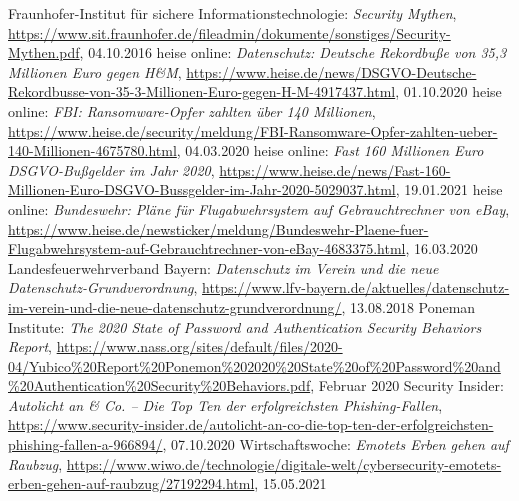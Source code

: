 \begin{frame}
{\begin{thebibliography}{LFVByXX}
     Fraunhofer-Institut für sichere Informationstechnologie: \textit{Security Mythen},  \href{https://www.sit.fraunhofer.de/fileadmin/dokumente/sonstiges/Security-Mythen.pdf}{\url{https://www.sit.fraunhofer.de/fileadmin/dokumente/sonstiges/Security-Mythen.pdf}}, 04.10.2016
     heise online: \textit{Datenschutz: Deutsche Rekordbuße von 35,3 Millionen Euro gegen H\&M}, \href{https://www.heise.de/news/DSGVO-Deutsche-Rekordbusse-von-35-3-Millionen-Euro-gegen-H-M-4917437.html}{\url{https://www.heise.de/news/DSGVO-Deutsche-Rekordbusse-von-35-3-Millionen-Euro-gegen-H-M-4917437.html}}, 01.10.2020
     heise online: \textit{FBI: Ransomware-Opfer zahlten über 140 Millionen}, \href{https://www.heise.de/security/meldung/FBI-Ransomware-Opfer-zahlten-ueber-140-Millionen-4675780.html}{\url{https://www.heise.de/security/meldung/FBI-Ransomware-Opfer-zahlten-ueber-140-Millionen-4675780.html}}, 04.03.2020
     heise online: \textit{Fast 160 Millionen Euro DSGVO-Bußgelder im Jahr 2020}, \href{https://www.heise.de/news/Fast-160-Millionen-Euro-DSGVO-Bussgelder-im-Jahr-2020-5029037.html}{\url{https://www.heise.de/news/Fast-160-Millionen-Euro-DSGVO-Bussgelder-im-Jahr-2020-5029037.html}}, 19.01.2021
     heise online: \textit{Bundeswehr: Pläne für Flugabwehrsystem auf Gebrauchtrechner von eBay}, \href{https://www.heise.de/newsticker/meldung/Bundeswehr-Plaene-fuer-Flugabwehrsystem-auf-Gebrauchtrechner-von-eBay-4683375.html}{\url{https://www.heise.de/newsticker/meldung/Bundeswehr-Plaene-fuer-Flugabwehrsystem-auf-Gebrauchtrechner-von-eBay-4683375.html}}, 16.03.2020
     Landesfeuerwehrverband Bayern: \textit{Datenschutz im Verein und die neue Datenschutz-Grundverordnung},  \href{https://www.lfv-bayern.de/aktuelles/datenschutz-im-verein-und-die-neue-datenschutz-grundverordnung/}{\url{https://www.lfv-bayern.de/aktuelles/datenschutz-im-verein-und-die-neue-datenschutz-grundverordnung/}}, 13.08.2018
     Poneman Institute: \textit{The 2020 State of Password and Authentication Security Behaviors Report}, \href{https://www.nass.org/sites/default/files/2020-04/Yubico\%20Report\%20Ponemon\%202020\%20State\%20of\%20Password\%20and\%20Authentication\%20Security\%20Behaviors.pdf}{\url{https://www.nass.org/sites/default/files/2020-04/Yubico\%20Report\%20Ponemon\%202020\%20State\%20of\%20Password\%20and\%20Authentication\%20Security\%20Behaviors.pdf}}, Februar 2020
     Security Insider: \textit{Autolicht an \& Co. -- Die Top Ten der erfolgreichsten Phishing-Fallen}, \href{https://www.security-insider.de/autolicht-an-co-die-top-ten-der-erfolgreichsten-phishing-fallen-a-966894/}{\url{https://www.security-insider.de/autolicht-an-co-die-top-ten-der-erfolgreichsten-phishing-fallen-a-966894/}}, 07.10.2020
     Wirtschaftswoche: \textit{Emotets Erben gehen auf Raubzug}, \href{https://www.wiwo.de/technologie/digitale-welt/cybersecurity-emotets-erben-gehen-auf-raubzug/27192294.html}{\url{https://www.wiwo.de/technologie/digitale-welt/cybersecurity-emotets-erben-gehen-auf-raubzug/27192294.html}}, 15.05.2021
  \end{thebibliography}
}
\end{frame}


